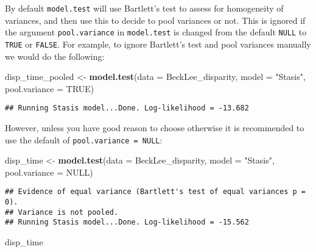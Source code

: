 \documentclass[
]{book}
\newenvironment{Shaded}{\begin{snugshade}}{\end{snugshade}}
\newcommand{\AttributeTok}[1]{\textcolor[rgb]{0.13,0.29,0.53}{#1}}
\newcommand{\ConstantTok}[1]{\textcolor[rgb]{0.56,0.35,0.01}{#1}}
\newcommand{\FunctionTok}[1]{\textcolor[rgb]{0.13,0.29,0.53}{\textbf{#1}}}
\newcommand{\NormalTok}[1]{#1}
\newcommand{\OtherTok}[1]{\textcolor[rgb]{0.56,0.35,0.01}{#1}}
\newcommand{\StringTok}[1]{\textcolor[rgb]{0.31,0.60,0.02}{#1}}
\begin{document}
By default \texttt{model.test} will use Bartlett's test to assess for homogeneity of variances, and then use this to decide to pool variances or not.
This is ignored if the argument \texttt{pool.variance} in \texttt{model.test} is changed from the default \texttt{NULL} to \texttt{TRUE} or \texttt{FALSE}.
For example, to ignore Bartlett's test and pool variances manually we would do the following:

\begin{Shaded}
\begin{Highlighting}[]
\NormalTok{disp\_time\_pooled }\OtherTok{\textless{}{-}} \FunctionTok{model.test}\NormalTok{(}\AttributeTok{data =}\NormalTok{ BeckLee\_disparity,}
                               \AttributeTok{model =} \StringTok{"Stasis"}\NormalTok{,}
                               \AttributeTok{pool.variance =} \ConstantTok{TRUE}\NormalTok{)}
\end{Highlighting}
\end{Shaded}

\begin{verbatim}
## Running Stasis model...Done. Log-likelihood = -13.682
\end{verbatim}

However, unless you have good reason to choose otherwise it is recommended to use the default of \texttt{pool.variance\ =\ NULL}:

\begin{Shaded}
\begin{Highlighting}[]
\NormalTok{disp\_time }\OtherTok{\textless{}{-}} \FunctionTok{model.test}\NormalTok{(}\AttributeTok{data =}\NormalTok{ BeckLee\_disparity,}
                        \AttributeTok{model =} \StringTok{"Stasis"}\NormalTok{,}
                        \AttributeTok{pool.variance =} \ConstantTok{NULL}\NormalTok{)}
\end{Highlighting}
\end{Shaded}

\begin{verbatim}
## Evidence of equal variance (Bartlett's test of equal variances p = 0).
## Variance is not pooled.
## Running Stasis model...Done. Log-likelihood = -15.562
\end{verbatim}

\begin{Shaded}
\begin{Highlighting}[]
\NormalTok{disp\_time}
\end{Highlighting}
\end{Shaded}
\end{document}
